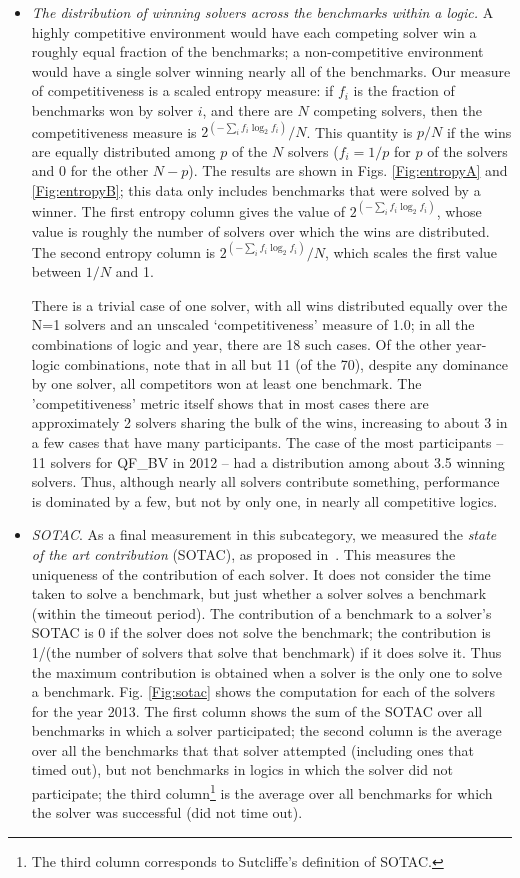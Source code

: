 \documentclass[smallcondensed]{svjour3}
\begin{document}
\begin{itemize}
\item {\em The distribution of winning solvers across the benchmarks within a logic.} A highly competitive environment would have each competing solver win a roughly equal fraction of the benchmarks; a non-competitive environment would have a single solver winning nearly all of the benchmarks. Our measure of competitiveness is a scaled entropy measure: if $f_i$ is the fraction of benchmarks won by solver $i$, and there are $N$ competing solvers, then the competitiveness measure is $ 2^{( - \sum_i f_i \log_2 f_i )} / N$. This quantity is $p/N$ if the wins are equally distributed among $p$ of the $N$ solvers ($f_i = 1/p$ for $p$ of the solvers and 0 for the other $N-p$). The results are shown in Figs. \ref{Fig:entropyA} and \ref{Fig:entropyB}; this data only includes benchmarks that were solved by a winner. The first entropy column gives the value of $ 2^{( - \sum_i f_i \log_2 f_i )}$, whose value is roughly the number of solvers over which the wins are distributed. The second entropy column is  $ 2^{( - \sum_i f_i \log_2 f_i )} / N$, which scales the first value between 
$1/N$ and 1.

There is a trivial case of one solver, with all wins distributed equally over the N=1 solvers and an unscaled `competitiveness' measure of 1.0; in all the combinations of logic and year, there are 18 such cases. Of the other year-logic combinations, note that in all but 11 (of the 70), despite any dominance by one solver, all competitors won at least one benchmark. The 'competitiveness' metric itself shows that in most cases there are approximately 2 solvers sharing the bulk of the wins, increasing to about 3 in a few cases that have many participants. The case of the most participants -- 11 solvers for QF\_BV in 2012 -- had a distribution among about 3.5 winning solvers. Thus, although nearly all solvers contribute something, performance is dominated by a few, but not by only one, in nearly all competitive logics.

\item {\em SOTAC}. As a final measurement in this subcategory, we measured the {\em state of the art contribution} (SOTAC), as proposed  in~\cite{webCASC}. This measures the uniqueness of the contribution of each solver. It does not consider the time taken to solve a benchmark, but just whether a solver solves a benchmark (within the timeout period). The contribution of a benchmark to a solver's SOTAC is 0 if the solver does not solve the benchmark; the contribution is 1/(the number of solvers that solve that benchmark) if it does solve it. Thus the maximum contribution is obtained when a solver is the only one to solve a benchmark. Fig. \ref{Fig:sotac} shows the computation for each of the solvers for the year 2013. The first column shows the sum of the SOTAC over all benchmarks in which a solver participated;
the second column is the average over all the benchmarks that that solver attempted (including ones that timed out), but not benchmarks in logics in which the solver did not participate; the third column\footnote{The third column corresponds to Sutcliffe's definition of SOTAC.} is the average over all benchmarks for which the solver was successful (did not time out).


\end{itemize}
\end{document}
